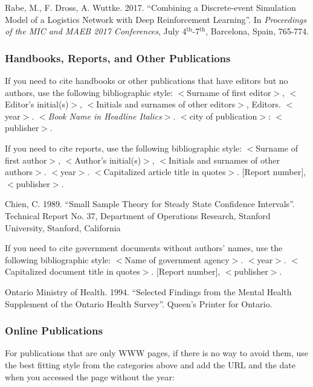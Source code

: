 \documentclass{wscpaperproc}
\theoremstyle{wsc}
\begin{document}
{\footnotesize
\begin{hangref}
\item Rabe, M., F. Dross, A. Wuttke. 2017. ``Combining a Discrete-event Simulation Model of a Logistics Network with Deep Reinforcement Learning''. In \textit{Proceedings of the MIC and MAEB 2017 Conferences}, July 4$^{\textrm{th}}$-7$^{\textrm{th}}$, Barcelona, Spain, 765-774.
\end{hangref}
}

\subsubsection{Handbooks, Reports, and Other Publications}
If you need to cite handbooks or other publications that have editors but no authors, use the following bibliographic style: 
$<$Surname of first editor$>$, $<$Editor’s initial(s)$>$, $<$Initials and surnames of other editors$>$, Editors. 
$<$year$>$. $<${\em Book Name in Headline Italics}$>$. $<$city of publication$>$: $<$publisher$>$.

If you need to cite reports, use the following bibliographic style: $<$Surname of first author$>$, $<$Author’s initial(s)$>$, $<$Initials and surnames of other authors$>$. $<$year$>$. $<$Capitalized article title in quotes$>$. $[$Report number$]$, $<$publisher$>$.

{\footnotesize
\begin{hangref}
\item Chien, C. 1989. ``Small Sample Theory for Steady State Confidence Intervals''. Technical Report No. 37, Department of Operations Research, Stanford University, Stanford, California
\end{hangref}
}

If you need to cite government documents without authors’ names, use the following bibliographic style: $<$Name of government agency$>$. $<$year$>$. $<$Capitalized document title in quotes$>$. $[$Report number$]$, $<$publisher$>$.

{\footnotesize
\begin{hangref}
\item Ontario Ministry of Health. 1994. ``Selected Findings from the Mental Health Supplement of the Ontario Health Survey''. Queen's Printer for Ontario.
\end{hangref}
}

\subsubsection{Online Publications}
For publications that are only WWW pages, if there is no way to avoid them, use the best fitting style from the categories above and add the URL and the date when you accessed the page without the year:
\end{document}
